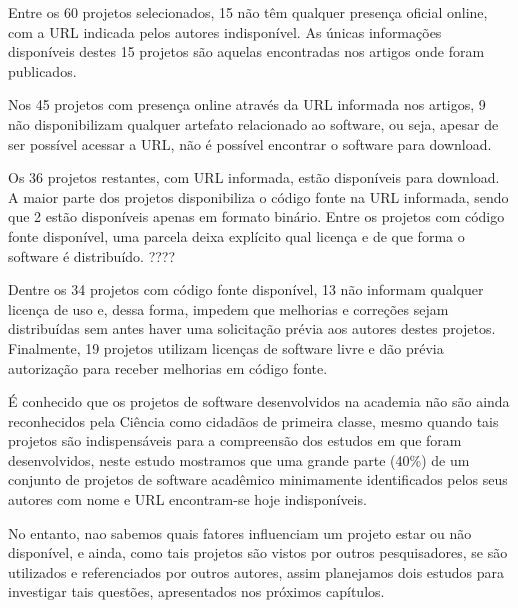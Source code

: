 Entre os 60 projetos selecionados, 15 não têm qualquer presença oficial online,
com a URL indicada pelos autores indisponível. As únicas informações
disponíveis destes 15 projetos são aquelas encontradas nos artigos onde foram
publicados.

Nos 45 projetos com presença online através da URL informada nos artigos,
9 não disponibilizam qualquer artefato relacionado ao software, ou seja, apesar de ser
possível acessar a URL, não é possível encontrar o software para download.

Os 36 projetos restantes, com URL informada, estão disponíveis para download. A maior
parte dos projetos disponibiliza o código fonte na URL informada, sendo que 2 estão disponíveis
apenas em formato binário. Entre os projetos com código fonte disponível,
uma parcela deixa explícito qual licença e de que forma o software é
distribuído. ????

Dentre os 34 projetos com código fonte disponível, 13 não informam qualquer
licença de uso e, dessa forma, impedem que melhorias e correções
sejam distribuídas sem antes haver uma solicitação prévia aos autores destes
projetos. Finalmente, 19 projetos utilizam licenças de software livre e dão
prévia autorização para receber melhorias em código fonte.

É conhecido que os projetos de software desenvolvidos na academia não são ainda
reconhecidos pela Ciência como cidadãos de primeira classe, mesmo quando tais
projetos são indispensáveis para a compreensão dos estudos em que foram
desenvolvidos, neste estudo mostramos que uma grande parte (40\%) de um
conjunto de projetos de software acadêmico minimamente identificados pelos seus
autores com nome e URL encontram-se hoje indisponíveis.

No entanto, nao sabemos quais fatores influenciam um projeto estar ou não
disponível, e ainda, como tais projetos são vistos por outros pesquisadores, se
são utilizados e referenciados por outros autores, assim planejamos dois
estudos para investigar tais questões, apresentados nos próximos capítulos.


